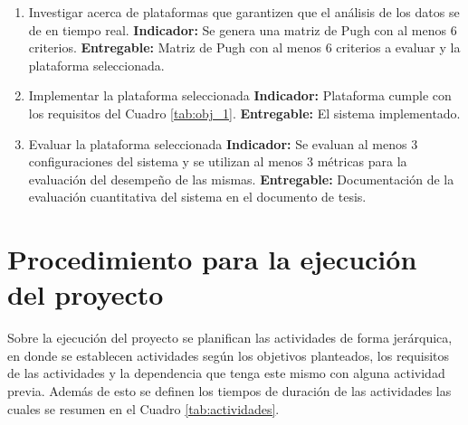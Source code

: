 \documentclass[12pt]{article}
\begin{document}
\begin{enumerate}
  \item Investigar acerca de plataformas que garantizen que el análisis de los datos se de en tiempo real. \newline
        \textbf{Indicador:} Se genera una matriz de Pugh con al menos 6 criterios.\newline
        \textbf{Entregable:} Matriz de Pugh con al menos 6 criterios a evaluar y la plataforma seleccionada.
  \item Implementar la plataforma seleccionada \newline
        \textbf{Indicador:} Plataforma cumple con los requisitos del Cuadro \ref{tab:obj_1}.\newline
        \textbf{Entregable:} El sistema implementado.
  \item Evaluar la plataforma seleccionada \newline
        \textbf{Indicador:} Se evaluan al menos 3 configuraciones del sistema y se utilizan al menos 3 métricas para la evaluación del desempeño de las mismas.\newline
        \textbf{Entregable:} Documentación de la evaluación cuantitativa del sistema en el documento de tesis.
\end{enumerate}

\section{Procedimiento para la ejecución del proyecto}

Sobre la ejecución del proyecto se planifican las actividades de forma jerárquica, en donde se establecen actividades según los objetivos planteados, los requisitos de las actividades y la dependencia que tenga este mismo con alguna actividad previa. Además de esto se definen los tiempos de duración de las actividades las cuales se resumen en el Cuadro \ref{tab:actividades}.
\end{document}
